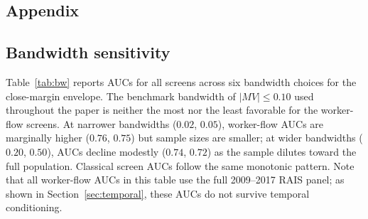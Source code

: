 \documentclass[12 pt]{elsarticle}
\begin{document}
\begin{subappendices}
\setcounter{table}{0} 
\setcounter{section}{0}
\setcounter{equation}{0} 
\setcounter{figure}{0} 
\renewcommand{\thetable}{\Alph{section}.\arabic{table}}
\renewcommand{\thesection}{\Alph{section}}
\renewcommand{\thesubsection}{\Alph{section}.\arabic{subsection}}
\renewcommand{\thefigure}{\Alph{section}.\arabic{figure}}

\clearpage

\section{Appendix}\label{ApA}

\subsection{Bandwidth sensitivity}\label{app:bandwidth}

Table~\ref{tab:bw} reports AUCs for all screens across six bandwidth choices for the close-margin envelope. The benchmark bandwidth of $\lvert MV \rvert \le 0.10$ used throughout the paper is neither the most nor the least favorable for the worker-flow screens. At narrower bandwidths ($0.02$, $0.05$), worker-flow AUCs are marginally higher ($0.76$, $0.75$) but sample sizes are smaller; at wider bandwidths ($0.20$, $0.50$), AUCs decline modestly ($0.74$, $0.72$) as the sample dilutes toward the full population. Classical screen AUCs follow the same monotonic pattern. Note that all worker-flow AUCs in this table use the full 2009--2017 RAIS panel; as shown in Section~\ref{sec:temporal}, these AUCs do not survive temporal conditioning.


\end{subappendices}
\end{document}

